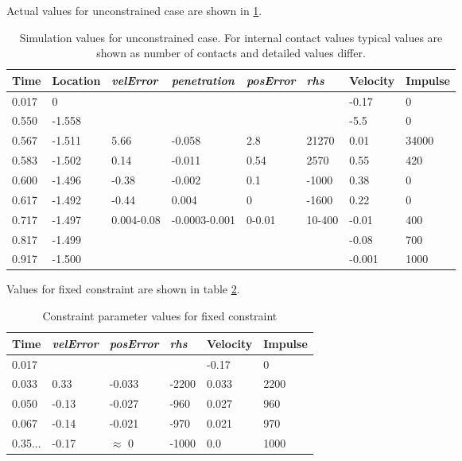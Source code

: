 Actual values for unconstrained case 
are shown in \ref{tab:freeBlockValues}.

\begin {table}[htb!]
\begin{center}
\begin{tabular}{|l| l|l| l|l|l|l|l|}
\hline
{\bf Time} & 
{\bf Location} &
{\it velError} & {\it penetration} & {\it posError} & {\it rhs} &
{\bf Velocity} & 
{\bf Impulse} \\  \hline
0.017 &  0 & & & &  &-0.17 & 0 \\  \hline
0.550 &  -1.558 & & & & & -5.5 & 0 \\  \hline
0.567 &  -1.511 & 5.66 &-0.058 &2.8 &  21270 & 0.01 & 34000 \\  \hline
0.583 &  -1.502 & 0.14 &-0.011 & 0.54& 2570  & 0.55 & 420 \\  \hline
0.600 &  -1.496 & -0.38&-0.002 & 0.1  & -1000& 0.38 & 0 \\  \hline
0.617 &  -1.492 &-0.44 & 0.004 & 0     & -1600& 0.22 & 0 \\  \hline
0.717 &  -1.497 &0.004-0.08  &-0.0003-0.001 &0-0.01 & 10-400 & -0.01 & 400 \\  \hline
0.817 &  -1.499 & & & & & -0.08 & 700 \\  \hline
0.917 &  -1.500 & & & & & -0.001 & 1000 \\  \hline
\end {tabular}
\end{center}
\caption {Simulation values for unconstrained case. 
For internal contact values typical values are shown
as number of contacts and detailed values differ.} 
\label{tab:freeBlockValues} 
\end {table}

Values for fixed constraint are shown in table
\ref{tab:fixedBlockValues}. 

\begin {table}[htb!]
\begin{center}
\begin{tabular}{|l| l| l|l|l|l|}
\hline
{\bf Time} & 
{\it velError} & {\it posError} & {\it rhs} &
{\bf Velocity} & 
{\bf Impulse} \\  \hline
0.017 &  & & & -0.17 & 0 \\  \hline
0.033 &  0.33 & -0.033 & -2200 & 0.033 & 2200 \\  \hline
0.050 &  -0.13 & -0.027 & -960 & 0.027 & 960 \\  \hline
0.067 &  -0.14 & -0.021 & -970 & 0.021 & 970 \\  \hline
0.35... &  -0.17 & $\approx$ 0 & -1000 &0.0 & 1000 \\  \hline
\end {tabular}
\end{center}
\caption {Constraint parameter values for fixed constraint} \label{tab:fixedBlockValues} 
\end {table}

